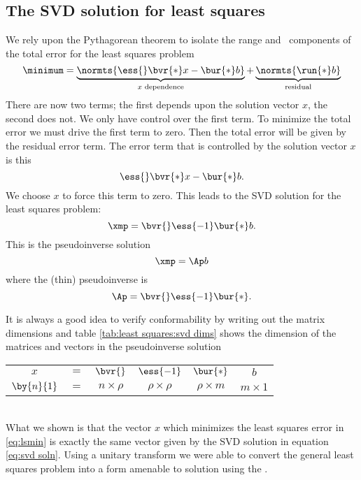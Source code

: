 \subsection{The SVD solution for least squares}
We rely upon the Pythagorean theorem to isolate the range and \ns \ components of the total error for the least squares problem
\begin{equation}
  \minimum = \underbrace{\normts{ \ess{} \bvr{*} x -\bur{*} b  }}_{x \text{ dependence}} + \underbrace{\normts{ \run{*} b  }}_{\text{residual}}
\end{equation}
There are now two terms; the first depends upon the solution vector $x$, the second does not. We only have control over the first term. To minimize the total error we must drive the first term to zero. Then the total error will be given by the residual error term.
The error term that is controlled by the solution vector $x$ is this
\begin{equation}
  \ess{} \bvr{*} x - \bur{*} b .
\end{equation}
We choose $x$ to force this term to zero. This leads to the SVD solution for the least squares problem:
\begin{equation}
  \xmp = \bvr{} \ess{-1} \bur{*} b.
  \label{eq:svd soln}
\end{equation}
This is the pseudoinverse solution
\begin{equation}
  \xmp = \Ap b
\end{equation}
where the (thin) pseudoinverse is
\begin{equation}
  \Ap = \bvr{} \ess{-1} \bur{*}.
  \label{eq:mpptsvd}
\end{equation}

It is always a good idea to verify conformability by writing out the matrix dimensions and table \eqref{tab:least squares:svd dims} shows the dimension of the matrices and vectors in the pseudoinverse solution
\begin{table}[!htdp]
\begin{center}
\begin{tabular}{cccccc}
%
  $x$ & $=$ & $\bvr{}$ &  $\ess{-1}$  & $\bur{*}$ & $b$ \\
%
  $\by{n}{1}$ & $=$ & $n\times \rho$ & $\rho\times \rho$ & $\rho\times m$ & $m\times 1$
%
\end{tabular}
\end{center}
\label{tab:least squares:svd dims}
\end{table} \\
What we shown is that the vector $x$ which minimizes the least squares error in \eqref{eq:lsmin} is exactly the same vector given by the SVD solution in equation \eqref{eq:svd soln}. Using a unitary transform we were able to convert the general least squares problem into a form amenable to solution using the \asvd.

